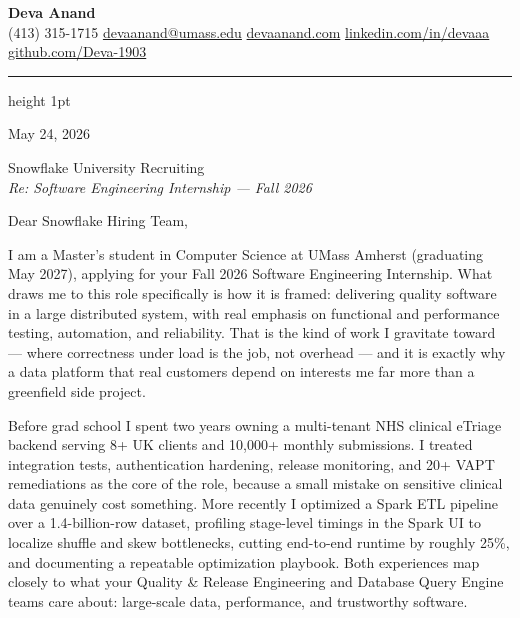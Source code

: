 \documentclass[letterpaper,11pt]{article}
\begin{document}
\begin{center}
  {\LARGE \bfseries \textcolor{ResumeNavy}{Deva Anand}} \\ \vspace{3pt}
  \small
  (413) 315-1715 \enspace\textbar\enspace
  \href{mailto:devaanand@umass.edu}{devaanand@umass.edu} \enspace\textbar\enspace
  \href{https://devaanand.com}{devaanand.com} \enspace\textbar\enspace
  \href{https://linkedin.com/in/devaaa/}{linkedin.com/in/devaaa} \enspace\textbar\enspace
  \href{https://github.com/Deva-1903}{github.com/Deva-1903}
\end{center}
\vspace{4pt}
{\color{ResumeNavy}\hrule height 1pt}
\vspace{12pt}

May 24, 2026

Snowflake University Recruiting \\
{\color{ResumeSlate}\textit{Re: Software Engineering Internship --- Fall 2026}}

\vspace{4pt}

Dear Snowflake Hiring Team,

I am a Master's student in Computer Science at UMass Amherst (graduating May 2027), applying for your Fall 2026 Software Engineering Internship. What draws me to this role specifically is how it is framed: delivering quality software in a large distributed system, with real emphasis on functional and performance testing, automation, and reliability. That is the kind of work I gravitate toward --- where correctness under load is the job, not overhead --- and it is exactly why a data platform that real customers depend on interests me far more than a greenfield side project.

Before grad school I spent two years owning a multi-tenant NHS clinical eTriage backend serving 8+ UK clients and 10,000+ monthly submissions. I treated integration tests, authentication hardening, release monitoring, and 20+ VAPT remediations as the core of the role, because a small mistake on sensitive clinical data genuinely cost something. More recently I optimized a Spark ETL pipeline over a 1.4-billion-row dataset, profiling stage-level timings in the Spark UI to localize shuffle and skew bottlenecks, cutting end-to-end runtime by roughly 25\%, and documenting a repeatable optimization playbook. Both experiences map closely to what your Quality \& Release Engineering and Database Query Engine teams care about: large-scale data, performance, and trustworthy software.
\end{document}
